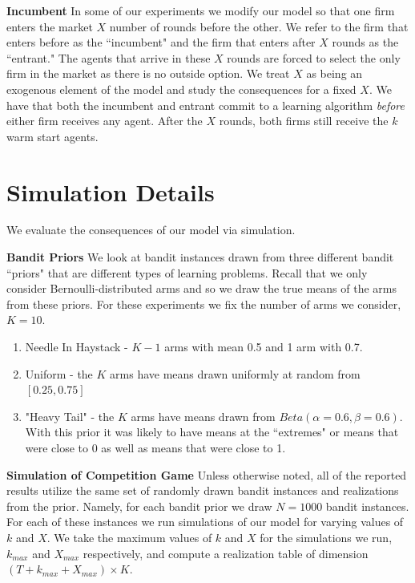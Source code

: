 \documentclass{article}
\theoremstyle{definition}
\begin{document}
\noindent \textbf{Incumbent} In some of our experiments we modify our model so that one firm enters the market $X$ number of rounds before the other. We refer to the firm that enters before as the ``incumbent" and the firm that enters after $X$ rounds as the ``entrant." The agents that arrive in these $X$ rounds are forced to select the only firm in the market as there is no outside option. We treat $X$ as being an exogenous element of the model and study the consequences for a fixed $X$. We have that both the incumbent and entrant commit to a learning algorithm \textit{before} either firm receives any agent. After the $X$ rounds, both firms still receive the $k$ warm start agents.

\section{Simulation Details}
\label{sim_details}

We evaluate the consequences of our model via simulation.

\textbf{Bandit Priors} We look at bandit instances drawn from three different bandit ``priors" that are different types of learning problems. Recall that we only consider Bernoulli-distributed arms and so we draw the true means of the arms from these priors. For these experiments we fix the number of arms we consider, $K = 10$.
\begin{enumerate}
\item Needle In Haystack - $K-1$ arms with mean 0.5 and 1 arm with 0.7.
\item Uniform - the $K$ arms have means drawn uniformly at random from $[0.25, 0.75]$
\item "Heavy Tail" - the $K$ arms have means drawn from $Beta(\alpha=0.6, \beta = 0.6)$. With this prior it was likely to have means at the ``extremes" or means that were close to 0 as well as means that were close to 1.
\end{enumerate} 

\noindent \textbf{Simulation of Competition Game} Unless otherwise noted, all of the reported results utilize the same set of randomly drawn bandit instances and realizations from the prior. Namely, for each bandit prior we draw $N = 1000$ bandit instances. For each of these instances we run simulations of our model for varying values of $k$ and $X$. We take the maximum values of $k$ and $X$ for the simulations we run, $k_{max}$ and $X_{max}$ respectively, and compute a realization table of dimension $(T+k_{max}+X_{max}) \times K$. 
\end{document}
